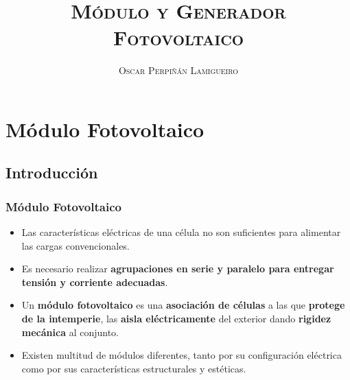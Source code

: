 \documentclass[xcolor=dvipsnames]{beamer}
\begin{document}
\title[\textsc{ESF:Modulo y Generador}]{\textsc{Módulo y Generador
    Fotovoltaico}}


\author{\textsc{Oscar Perpiñán Lamigueiro}}

\date{}

\begin{frame}[plain]
  \titlepage
\end{frame}


%

\section{Módulo Fotovoltaico}


\subsection{Introducción}


\begin{frame}
  \frametitle{Módulo Fotovoltaico}

  \begin{itemize}
  \item Las características eléctricas de una célula no son
    suficientes para alimentar las cargas convencionales.
  \item Es necesario realizar \textbf{agrupaciones en serie y paralelo
      para entregar tensión y corriente adecuadas}.
  \item Un \textbf{módulo fotovoltaico} es una \textbf{asociación de
      células} a las que \textbf{protege de la intemperie}, las
    \textbf{aisla eléctricamente} del exterior dando \textbf{rigidez
      mecánica} al conjunto.
  \item Existen multitud de módulos diferentes, tanto por su
    configuración eléctrica como por sus características estructurales
    y estéticas.
  \end{itemize}

\end{frame}
\end{document}
